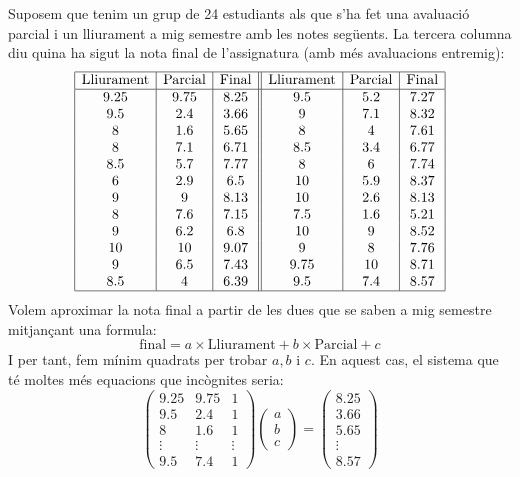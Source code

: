 \begin{exemple}
Suposem que tenim un grup de 24 estudiants als que s'ha fet una avaluació parcial i un lliurament a mig semestre amb les notes següents. La tercera columna diu quina ha sigut la nota final de l'assignatura (amb més avaluacions entremig):
\[
\begin{array}{|c|c|c||c|c|c|}
\hline \text{Lliurament} & \text{Parcial} & \text{Final} & 
\text{Lliurament} & \text{Parcial} & \text{Final}\\ \hline
9.25 & 9.75 & 8.25 & 
9.5 & 5.2 & 7.27 \\
9.5 & 2.4 & 3.66 &
9 & 7.1 & 8.32 \\
8 & 1.6 & 5.65 &
8 & 4 & 7.61 \\
8 & 7.1 & 6.71 &
8.5 & 3.4 & 6.77 \\
8.5 & 5.7 & 7.77 &
8 & 6 & 7.74 \\
6 & 2.9 & 6.5 &
10 & 5.9 & 8.37 \\
9 & 9 & 8.13 &
10 & 2.6 & 8.13 \\
8 & 7.6 & 7.15 &
7.5 & 1.6 & 5.21 \\
9 & 6.2 & 6.8 &
10 & 9 & 8.52 \\
10 & 10 & 9.07 &
9 & 8 & 7.76 \\
9 & 6.5 & 7.43 &
9.75 & 10 & 8.71 \\
8.5 & 4 & 6.39 &
9.5 & 7.4 & 8.57 \\ \hline
\end{array}
\]
Volem aproximar la nota final a partir de les dues que se saben a mig semestre mitjançant una formula:
\[
\text{final} = a \times \text{Lliurament} + b \times \text{Parcial} + c
\]
I per tant, fem mínim quadrats per trobar $a,b$ i $c$.
En aquest cas, el sistema que té moltes més equacions que incògnites seria:
\[
\begin{pmatrix}
9.25 & 9.75 & 1 \\
9.5 & 2.4 & 1 \\
8 & 1.6 & 1 \\
\vdots & \vdots & \vdots \\
9.5 & 7.4 & 1
\end{pmatrix}
\begin{pmatrix} a \\ b \\ c \end{pmatrix}=
\begin{pmatrix} 8.25 \\ 3.66 \\ 5.65 \\ \vdots \\ 8.57 \end{pmatrix}
\]
\end{exemple}
